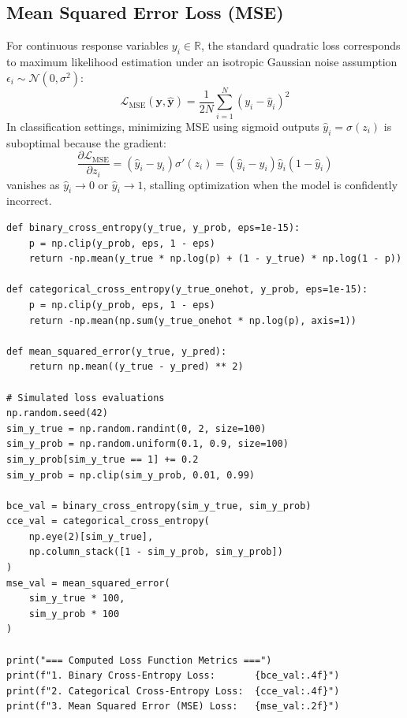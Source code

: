 \documentclass[12pt]{article}
\begin{document}
\subsection{Mean Squared Error Loss (MSE)}
For continuous response variables $y_i \in \mathbb{R}$, the standard quadratic loss corresponds to maximum likelihood estimation under an isotropic Gaussian noise assumption $\epsilon_i \sim \mathcal{N}(0, \sigma^2)$:
\begin{equation}
\mathcal{L}_{\text{MSE}}(\mathbf{y}, \hat{\mathbf{y}}) = \frac{1}{2N} \sum_{i=1}^N \left( y_i - \hat{y}_i \right)^2
\end{equation}
In classification settings, minimizing MSE using sigmoid outputs $\hat{y}_i = \sigma(z_i)$ is suboptimal because the gradient:
\begin{equation}
\frac{\partial \mathcal{L}_{\text{MSE}}}{\partial z_i} = (\hat{y}_i - y_i) \sigma'(z_i) = (\hat{y}_i - y_i) \hat{y}_i (1 - \hat{y}_i)
\end{equation}
vanishes as $\hat{y}_i \to 0$ or $\hat{y}_i \to 1$, stalling optimization when the model is confidently incorrect.

\begin{lstlisting}[style=code, caption={Vectorized Implementation of Neural Network Loss Functions}]
def binary_cross_entropy(y_true, y_prob, eps=1e-15):
    p = np.clip(y_prob, eps, 1 - eps)
    return -np.mean(y_true * np.log(p) + (1 - y_true) * np.log(1 - p))

def categorical_cross_entropy(y_true_onehot, y_prob, eps=1e-15):
    p = np.clip(y_prob, eps, 1 - eps)
    return -np.mean(np.sum(y_true_onehot * np.log(p), axis=1))

def mean_squared_error(y_true, y_pred):
    return np.mean((y_true - y_pred) ** 2)

# Simulated loss evaluations
np.random.seed(42)
sim_y_true = np.random.randint(0, 2, size=100)
sim_y_prob = np.random.uniform(0.1, 0.9, size=100)
sim_y_prob[sim_y_true == 1] += 0.2
sim_y_prob = np.clip(sim_y_prob, 0.01, 0.99)

bce_val = binary_cross_entropy(sim_y_true, sim_y_prob)
cce_val = categorical_cross_entropy(
    np.eye(2)[sim_y_true],
    np.column_stack([1 - sim_y_prob, sim_y_prob])
)
mse_val = mean_squared_error(
    sim_y_true * 100,
    sim_y_prob * 100
)

print("=== Computed Loss Function Metrics ===")
print(f"1. Binary Cross-Entropy Loss:       {bce_val:.4f}")
print(f"2. Categorical Cross-Entropy Loss:  {cce_val:.4f}")
print(f"3. Mean Squared Error (MSE) Loss:   {mse_val:.2f}")
\end{lstlisting}
\end{document}
